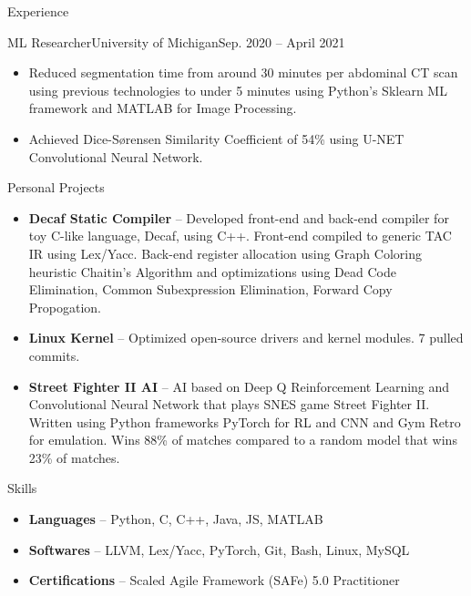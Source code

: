 \documentclass[]{mcdowellcv}
\begin{document}
\begin{cvsection}{Experience}
		\begin{cvsubsection}{ML Researcher}{University of Michigan}{Sep. 2020 -- April 2021}
			\small{
				\begin{itemize}
					\item Reduced segmentation time from around 30 minutes per abdominal CT scan using previous technologies to under 5 minutes using Python's Sklearn ML framework and MATLAB for Image Processing.
					\item Achieved Dice-Sørensen Similarity Coefficient of 54\% using U-NET Convolutional Neural Network.
				\end{itemize}
			}
		\end{cvsubsection}
	\end{cvsection}
	
	\begin{cvsection}{Personal Projects}
		\begin{cvsubsection}{}{}{}	
			\small{
				\begin{itemize}
					\item \textbf{Decaf Static Compiler} -- Developed front-end and back-end compiler for toy C-like language, Decaf, using C++. Front-end compiled to generic TAC IR using Lex/Yacc. Back-end register allocation using Graph Coloring heuristic Chaitin's Algorithm and optimizations using Dead Code Elimination, Common Subexpression Elimination, Forward Copy Propogation.
					\item \textbf{Linux Kernel} -- Optimized open-source drivers and kernel modules. 7 pulled commits.
					\item \textbf{Street Fighter II AI} -- AI based on Deep Q Reinforcement Learning and Convolutional Neural Network that plays SNES game Street Fighter II. Written using Python frameworks PyTorch for RL and CNN and Gym Retro for emulation. Wins 88\% of matches compared to a random model that wins 23\% of matches.
				\end{itemize}
			}
		\end{cvsubsection}
	\end{cvsection}

	\begin{cvsection}{Skills}
		\begin{cvsubsection}{}{}{}	
			\small{
				\begin{itemize}
					\item \textbf{Languages} -- Python, C, C++, Java, JS, MATLAB
					\item \textbf{Softwares} -- LLVM, Lex/Yacc, PyTorch, Git, Bash, Linux, MySQL
					\item \textbf{Certifications} -- Scaled Agile Framework (SAFe) 5.0 Practitioner
				\end{itemize}
			}
		\end{cvsubsection}
	\end{cvsection}
	
\end{document}
